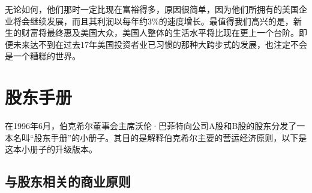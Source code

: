 \documentclass[UTF8,a4paper,zihao=-4,fontset = windows]{ctexart} %
\begin{document}
无论如何，他们那时一定比现在富裕得多，原因很简单，因为他们所拥有的美国企业将会继续发展，而且其利润以每年约3\%的速度增长。最值得我们高兴的是，新生的财富将最终惠及美国大众，美国人整体的生活水平将比现在更上一个台阶。即便未来达不到在过去17年美国投资者业已习惯的那种大跨步式的发展，也注定不会是一个糟糕的世界。

\section{股东手册}

在1996年6月，伯克希尔董事会主席沃伦·巴菲特向公司A股和B股的股东分发了一本名叫“股东手册”的小册子。其目的是解释伯克希尔主要的营运经济原则，以下是这本小册子的升级版本。
\subsection{与股东相关的商业原则}
\end{document}
